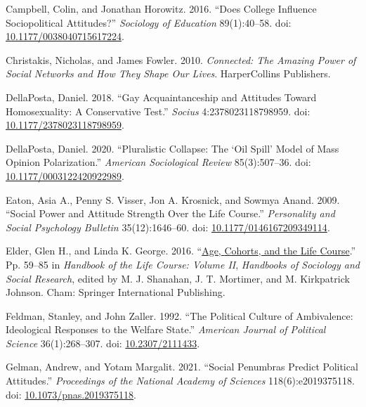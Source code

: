 \documentclass[
  11pt,
]{article}
\newlength{\cslhangindent}
\newlength{\cslentryspacingunit} %
\newenvironment{CSLReferences}[2] %
 {%
  \setlength{\parindent}{0pt}
  \ifodd #1
  \let\oldpar\par
  \def\par{\hangindent=\cslhangindent\oldpar}
  \fi
  \setlength{\parskip}{#2\cslentryspacingunit}
 }%
 {}
\begin{document}
\begin{CSLReferences}{1}{0}
\leavevmode{}%
Campbell, Colin, and Jonathan Horowitz. 2016. {``Does {College}
{Influence} {Sociopolitical} {Attitudes}?''} \emph{Sociology of
Education} 89(1):40--58. doi:
\href{https://doi.org/10.1177/0038040715617224}{10.1177/0038040715617224}.

\leavevmode{}%
Christakis, Nicholas, and James Fowler. 2010. \emph{Connected: {The}
{Amazing} {Power} of {Social} {Networks} and {How} {They} {Shape} {Our}
{Lives}}. HarperCollins Publishers.

\leavevmode{}%
DellaPosta, Daniel. 2018. {``Gay {Acquaintanceship} and {Attitudes}
Toward {Homosexuality}: {A} {Conservative} {Test}.''} \emph{Socius}
4:2378023118798959. doi:
\href{https://doi.org/10.1177/2378023118798959}{10.1177/2378023118798959}.

\leavevmode{}%
DellaPosta, Daniel. 2020. {``Pluralistic {Collapse}: {The} {`{Oil}
{Spill}'} {Model} of {Mass} {Opinion} {Polarization}.''} \emph{American
Sociological Review} 85(3):507--36. doi:
\href{https://doi.org/10.1177/0003122420922989}{10.1177/0003122420922989}.

\leavevmode{}%
Eaton, Asia A., Penny S. Visser, Jon A. Krosnick, and Sowmya Anand.
2009. {``Social {Power} and {Attitude} {Strength} {Over} the {Life}
{Course}.''} \emph{Personality and Social Psychology Bulletin}
35(12):1646--60. doi:
\href{https://doi.org/10.1177/0146167209349114}{10.1177/0146167209349114}.

\leavevmode{}%
Elder, Glen H., and Linda K. George. 2016.
{``\href{https://doi.org/10.1007/978-3-319-20880-0_3}{Age, {Cohorts},
and the {Life} {Course}}.''} Pp. 59--85 in \emph{Handbook of the {Life}
{Course}: {Volume} {II}}, \emph{Handbooks of {Sociology} and {Social}
{Research}}, edited by M. J. Shanahan, J. T. Mortimer, and M.
Kirkpatrick Johnson. Cham: Springer International Publishing.

\leavevmode{}%
Feldman, Stanley, and John Zaller. 1992. {``The {Political} {Culture} of
{Ambivalence}: {Ideological} {Responses} to the {Welfare} {State}.''}
\emph{American Journal of Political Science} 36(1):268--307. doi:
\href{https://doi.org/10.2307/2111433}{10.2307/2111433}.

\leavevmode{}%
Gelman, Andrew, and Yotam Margalit. 2021. {``Social Penumbras Predict
Political Attitudes.''} \emph{Proceedings of the National Academy of
Sciences} 118(6):e2019375118. doi:
\href{https://doi.org/10.1073/pnas.2019375118}{10.1073/pnas.2019375118}.


\end{CSLReferences}
\end{document}
